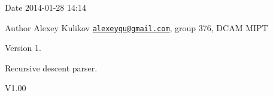 \begin{DoxyDate}{Date}
2014-\/01-\/28 14\-:14 
\end{DoxyDate}
\begin{DoxyAuthor}{Author}
Alexey Kulikov \href{mailto:alexeyqu@gmail.com}{\tt alexeyqu@gmail.\-com}, group 376, D\-C\-A\-M M\-I\-P\-T 
\end{DoxyAuthor}
\begin{DoxyVersion}{Version}
1.
\end{DoxyVersion}
Recursive descent parser.

\begin{DoxyParagraph}{V1.00}

\end{DoxyParagraph}
